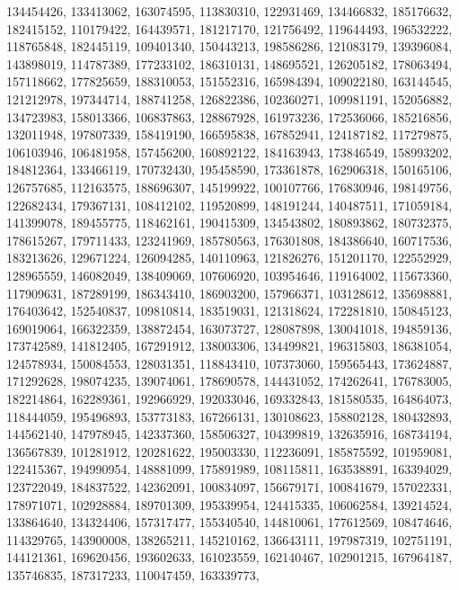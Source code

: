 {{    134454426, 133413062, 163074595, 113830310, 122931469, 134466832,
    185176632, 182415152, 110179422, 164439571, 181217170, 121756492,
    119644493, 196532222, 118765848, 182445119, 109401340, 150443213,
    198586286, 121083179, 139396084, 143898019, 114787389, 177233102,
    186310131, 148695521, 126205182, 178063494, 157118662, 177825659,
    188310053, 151552316, 165984394, 109022180, 163144545, 121212978,
    197344714, 188741258, 126822386, 102360271, 109981191, 152056882,
    134723983, 158013366, 106837863, 128867928, 161973236, 172536066,
    185216856, 132011948, 197807339, 158419190, 166595838, 167852941,
    124187182, 117279875, 106103946, 106481958, 157456200, 160892122,
    184163943, 173846549, 158993202, 184812364, 133466119, 170732430,
    195458590, 173361878, 162906318, 150165106, 126757685, 112163575,
    188696307, 145199922, 100107766, 176830946, 198149756, 122682434,
    179367131, 108412102, 119520899, 148191244, 140487511, 171059184,
    141399078, 189455775, 118462161, 190415309, 134543802, 180893862,
    180732375, 178615267, 179711433, 123241969, 185780563, 176301808,
    184386640, 160717536, 183213626, 129671224, 126094285, 140110963,
    121826276, 151201170, 122552929, 128965559, 146082049, 138409069,
    107606920, 103954646, 119164002, 115673360, 117909631, 187289199,
    186343410, 186903200, 157966371, 103128612, 135698881, 176403642,
    152540837, 109810814, 183519031, 121318624, 172281810, 150845123,
    169019064, 166322359, 138872454, 163073727, 128087898, 130041018,
    194859136, 173742589, 141812405, 167291912, 138003306, 134499821,
    196315803, 186381054, 124578934, 150084553, 128031351, 118843410,
    107373060, 159565443, 173624887, 171292628, 198074235, 139074061,
    178690578, 144431052, 174262641, 176783005, 182214864, 162289361,
    192966929, 192033046, 169332843, 181580535, 164864073, 118444059,
    195496893, 153773183, 167266131, 130108623, 158802128, 180432893,
    144562140, 147978945, 142337360, 158506327, 104399819, 132635916,
    168734194, 136567839, 101281912, 120281622, 195003330, 112236091,
    185875592, 101959081, 122415367, 194990954, 148881099, 175891989,
    108115811, 163538891, 163394029, 123722049, 184837522, 142362091,
    100834097, 156679171, 100841679, 157022331, 178971071, 102928884,
    189701309, 195339954, 124415335, 106062584, 139214524, 133864640,
    134324406, 157317477, 155340540, 144810061, 177612569, 108474646,
    114329765, 143900008, 138265211, 145210162, 136643111, 197987319,
    102751191, 144121361, 169620456, 193602633, 161023559, 162140467,
    102901215, 167964187, 135746835, 187317233, 110047459, 163339773,
}}
